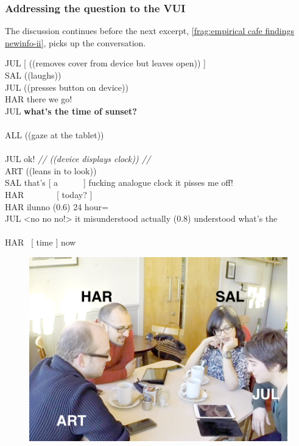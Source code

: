 \crpagebreak\subsubsection{Addressing the question to the VUI}\label{sec:empirical cafe findings newinfo addressing}
\begin{revisedsubmission}
The discussion continues before the next excerpt, \autoref{frag:empirical cafe findings newinfo-ii}, picks up the conversation.%

\begin{inlinefrag}
    {
    \begin{transcript}[16]
        \by JUL {[ ((removes cover from device but leaves open)) ]} \\
        \by SAL {((laughs))} \\
        \by JUL {((presses button on device))} \\
        \by HAR {there we go!} \\
        \by JUL {\textbf{what’s the time of sunset?}} \\
         \\
        \by ALL {((gaze at the tablet))} \\
         \\
        \by JUL {ok! \textit{// ((device displays clock)) //}} \\
        \by ART {((leans in to look))} \\
        \by SAL {that’s [ a~~~~~~] fucking analogue clock it pisses me off!} \\
        \by HAR {~~~~~~~[ today? ]} \\
        \by HAR {ilunno (0.6) 24 hour=} \\
        \by JUL {<no no no!> it misunderstood actually (0.8) understood what’s the} \\
        \by     {~[ time ]} \\
        \by HAR {~[ time ] now} \\
    \end{transcript}
    \caption{When Does the Sun Go Down? (ii)}\label{frag:empirical cafe findings newinfo-ii}
    \begin{figure}[bth]
        \centering
            \includegraphics[width=.7\linewidth]{Graphics/3-2-Empirical-Cafe/FragmentSunset-2}%

\end{figure}}
\end{inlinefrag}
\end{revisedsubmission}
